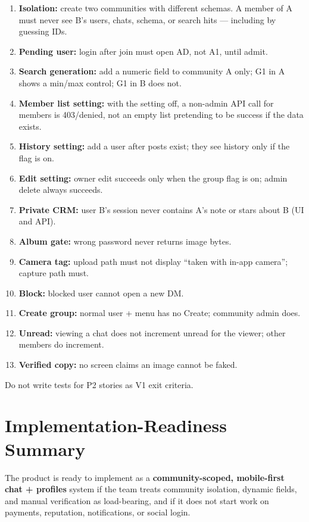 \documentclass[11pt,a4paper]{article}
\begin{document}
\begin{enumerate}[leftmargin=1.6em]
  \item \textbf{Isolation:} create two communities with different schemas. A member of A must never see B's users, chats, schema, or search hits --- including by guessing IDs.
  \item \textbf{Pending user:} login after join must open AD, not A1, until admit.
  \item \textbf{Search generation:} add a numeric field to community A only; G1 in A shows a min/max control; G1 in B does not.
  \item \textbf{Member list setting:} with the setting off, a non-admin API call for members is 403/denied, not an empty list pretending to be success if the data exists.
  \item \textbf{History setting:} add a user after posts exist; they see history only if the flag is on.
  \item \textbf{Edit setting:} owner edit succeeds only when the group flag is on; admin delete always succeeds.
  \item \textbf{Private CRM:} user B's session never contains A's note or stars about B (UI and API).
  \item \textbf{Album gate:} wrong password never returns image bytes.
  \item \textbf{Camera tag:} upload path must not display ``taken with in-app camera''; capture path must.
  \item \textbf{Block:} blocked user cannot open a new DM.
  \item \textbf{Create group:} normal user + menu has no Create; community admin does.
  \item \textbf{Unread:} viewing a chat does not increment unread for the viewer; other members do increment.
  \item \textbf{Verified copy:} no screen claims an image cannot be faked.
\end{enumerate}

Do not write tests for P2 stories as V1 exit criteria.

\section{Implementation-Readiness Summary}
The product is ready to implement as a \textbf{community-scoped, mobile-first chat + profiles} system if the team treats community isolation, dynamic fields, and manual verification as load-bearing, and if it does not start work on payments, reputation, notifications, or social login.
\end{document}
